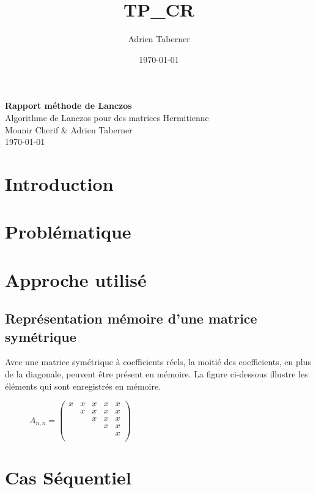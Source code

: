 \documentclass[11pt,french]{article}
\title{TP\_CR}
\author{Adrien Taberner}
\date{ \today}
\begin{document}
	
	\begin{center}
		\huge
		\textbf{Rapport méthode de Lanczos}\\
		\vspace{15pt}
		\LARGE
		Algorithme de Lanczos pour des matrices Hermitienne\\
		\vspace{10pt}	
		\large
		 Mounir Cherif \& Adrien Taberner  \\ 
		 \today  \\
		\vspace{5pt}	
	\end{center} 
	\vspace{25pt}	
	\tableofcontents
		
	\newpage
	
	\section{Introduction}


	\section{Problématique}
	
	\section{Approche utilisé}
	
	\subsection{Représentation mémoire d'une matrice symétrique}
	Avec une matrice symétrique à coefficients réels, la moitié des coefficients, en plus de la diagonale, peuvent être présent en mémoire. La figure ci-dessous illustre les éléments qui sont enregistrés en mémoire.
		\begin{figure}[h]
		\centering
		$A _{n, n}=
		\begin{pmatrix}
			x & x & x & x & x \\  
			   & x & x & x & x \\  
			   &   & x & x & x \\  
			   &   &   & x & x \\  
			   &   &   &   & x \\  
		\end{pmatrix}
		$
	\end{figure}
	 \newpage 
	\section{Cas Séquentiel}
	
\end{document}
